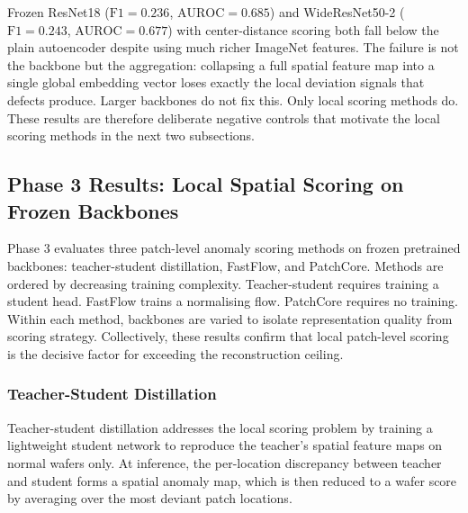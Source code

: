 \documentclass[11pt]{article}
\begin{document}
Frozen ResNet18 ($\mathrm{F1}=0.236$, $\mathrm{AUROC}=0.685$) and
WideResNet50-2 ($\mathrm{F1}=0.243$, $\mathrm{AUROC}=0.677$) with
center-distance scoring both fall below the plain autoencoder
despite using much richer ImageNet features. The failure is not the
backbone but the aggregation: collapsing a full spatial feature map into
a single global embedding vector loses exactly the local deviation signals
that defects produce. Larger backbones do not fix this. Only local scoring
methods do. These results are therefore deliberate negative controls that
motivate the local scoring methods in the next two subsections.

\subsection{Phase 3 Results: Local Spatial Scoring on Frozen Backbones}

Phase 3 evaluates three patch-level anomaly scoring methods on frozen pretrained backbones: teacher-student
distillation, FastFlow, and PatchCore. Methods are ordered by decreasing training complexity.
Teacher-student requires training a student head. FastFlow trains a normalising flow. PatchCore requires no training.
Within each method, backbones are varied to isolate representation quality from scoring strategy.
Collectively, these results confirm that local patch-level scoring is the decisive factor for exceeding the reconstruction ceiling.

\subsubsection{Teacher-Student Distillation}

Teacher-student distillation addresses the local scoring problem by training
a lightweight student network to reproduce the teacher's spatial feature maps
on normal wafers only. At inference, the per-location discrepancy between
teacher and student forms a spatial anomaly map, which is then reduced to a
wafer score by averaging over the most deviant patch locations.
\end{document}

